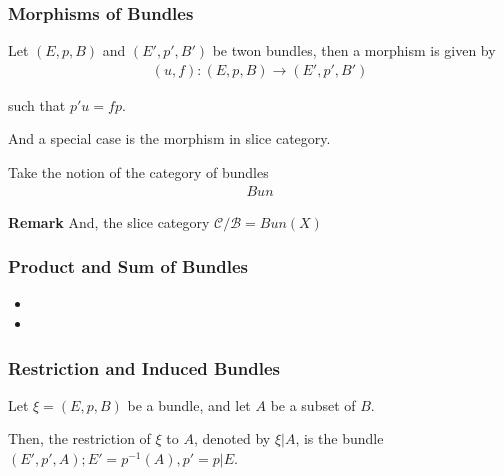 \documentclass[Total.tex]{subfiles}
\begin{document}
	\subsubsection{Morphisms of Bundles}
		\begin{Def}
			Let $(E,p,B)$ and $(E',p',B')$ be twon bundles, then a morphism is given by
			\begin{gather*}
				(u,f):(E,p,B)\rightarrow (E',p',B')
			\end{gather*}
			
			such that $p'u=fp$. 
			\begin{center}
			\end{center}
			
			And a special case is the morphism in slice category. 
		\end{Def}
		
		\begin{Def}
			Take the notion of the category of bundles
			\begin{gather*}
				Bun
			\end{gather*}
		\end{Def}
		
		\textbf{Remark} And, the slice category $\mathcal{C}/\mathcal{B}=Bun(X)$
		
		\subsubsection{Product and Sum of Bundles}
		\begin{Def}
			\begin{itemize}
				\item 
				\item 
			\end{itemize}
		\end{Def}
		\subsubsection{Restriction and Induced Bundles}
		\begin{Def}
			Let $\xi=(E,p,B)$ be a bundle, and let $A$ be a subset of $B$.
			
			Then, the restriction of $\xi$ to $A$, denoted by $\xi|A$, is the bundle $(E',p',A);E'=p^{-1}(A),p'=p|E$.
		\end{Def}
		
\end{document}
